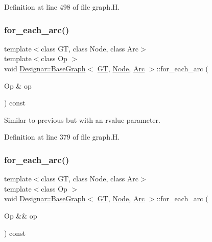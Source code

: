 Definition at line 498 of file graph.\+H.

\mbox{\label{class_designar_1_1_base_graph_ac46a1a7517a6c7029c6bae23d480cfa9}} 
\subsubsection{\texorpdfstring{for\+\_\+each\+\_\+arc()}{for\_each\_arc()}\hspace{0.1cm}{\footnotesize\ttfamily [1/2]}}
{\footnotesize\ttfamily template$<$class GT, class Node, class Arc$>$ \\
template$<$class Op $>$ \\
void \hyperlink{class_designar_1_1_base_graph}{Designar\+::\+Base\+Graph}$<$ \hyperlink{demo-buildgraph_8_c_a3001c40d2c31ca87ed96cd7d1334a55e}{GT}, \hyperlink{namespace_designar_a5af326c65aa2bd26b26c410f2030d09e}{Node}, \hyperlink{namespace_designar_a3f55fb5513d62ff47cbc8f72b8e95d6f}{Arc} $>$\+::for\+\_\+each\+\_\+arc (\begin{DoxyParamCaption}\item[{Op \&}]{op }\end{DoxyParamCaption}) const\hspace{0.3cm}{\ttfamily [inline]}}



Similar to previous but with an rvalue parameter. 



Definition at line 379 of file graph.\+H.

\mbox{\label{class_designar_1_1_base_graph_ae76905d5baebd62d0fc481efc7c20f66}} 
\subsubsection{\texorpdfstring{for\+\_\+each\+\_\+arc()}{for\_each\_arc()}\hspace{0.1cm}{\footnotesize\ttfamily [2/2]}}
{\footnotesize\ttfamily template$<$class GT, class Node, class Arc$>$ \\
template$<$class Op $>$ \\
void \hyperlink{class_designar_1_1_base_graph}{Designar\+::\+Base\+Graph}$<$ \hyperlink{demo-buildgraph_8_c_a3001c40d2c31ca87ed96cd7d1334a55e}{GT}, \hyperlink{namespace_designar_a5af326c65aa2bd26b26c410f2030d09e}{Node}, \hyperlink{namespace_designar_a3f55fb5513d62ff47cbc8f72b8e95d6f}{Arc} $>$\+::for\+\_\+each\+\_\+arc (\begin{DoxyParamCaption}\item[{Op \&\&}]{op }\end{DoxyParamCaption}) const\hspace{0.3cm}{\ttfamily [inline]}}



